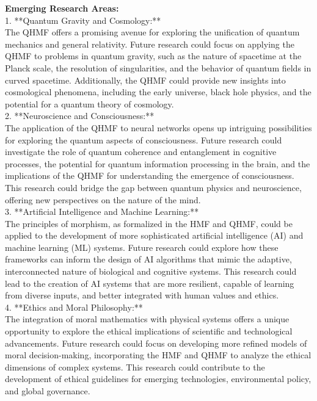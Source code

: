 \documentclass{article}
\begin{document}
\textbf{Emerging Research Areas:}
\\

1. **Quantum Gravity and Cosmology:**
\\

   The QHMF offers a promising avenue for exploring the unification of quantum mechanics and general relativity. Future research could focus on applying the QHMF to problems in quantum gravity, such as the nature of spacetime at the Planck scale, the resolution of singularities, and the behavior of quantum fields in curved spacetime. Additionally, the QHMF could provide new insights into cosmological phenomena, including the early universe, black hole physics, and the potential for a quantum theory of cosmology.
\\

2. **Neuroscience and Consciousness:**
\\

   The application of the QHMF to neural networks opens up intriguing possibilities for exploring the quantum aspects of consciousness. Future research could investigate the role of quantum coherence and entanglement in cognitive processes, the potential for quantum information processing in the brain, and the implications of the QHMF for understanding the emergence of consciousness. This research could bridge the gap between quantum physics and neuroscience, offering new perspectives on the nature of the mind.
\\

3. **Artificial Intelligence and Machine Learning:**
\\

   The principles of morphism, as formalized in the HMF and QHMF, could be applied to the development of more sophisticated artificial intelligence (AI) and machine learning (ML) systems. Future research could explore how these frameworks can inform the design of AI algorithms that mimic the adaptive, interconnected nature of biological and cognitive systems. This research could lead to the creation of AI systems that are more resilient, capable of learning from diverse inputs, and better integrated with human values and ethics.
\\

4. **Ethics and Moral Philosophy:**
\\

   The integration of moral mathematics with physical systems offers a unique opportunity to explore the ethical implications of scientific and technological advancements. Future research could focus on developing more refined models of moral decision-making, incorporating the HMF and QHMF to analyze the ethical dimensions of complex systems. This research could contribute to the development of ethical guidelines for emerging technologies, environmental policy, and global governance.
\\
\end{document}
